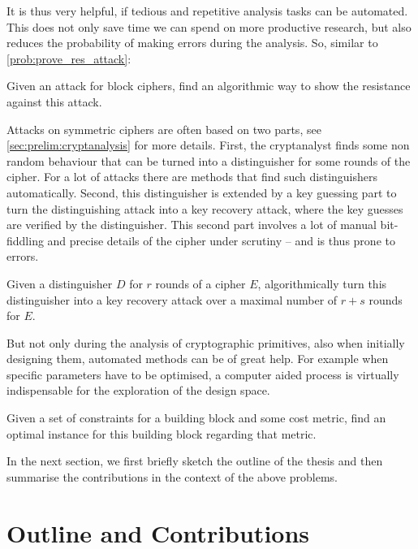 It is thus very helpful, if tedious and repetitive analysis tasks can be automated.
This does not only save time we can spend on more productive research, but also reduces the probability of making errors during the analysis.
So, similar to \cref{prob:prove_res_attack}:
\begin{problem}\label{prob:alg_res_attack}
    Given an attack for block ciphers, find an algorithmic way to show the resistance against this attack.
\end{problem}

Attacks on symmetric ciphers are often based on two parts, see \cref{sec:prelim:cryptanalysis} for more details.
First, the cryptanalyst finds some non random behaviour that can be turned into a distinguisher for some rounds of the cipher.
For a lot of attacks there are methods that find such distinguishers automatically.
Second, this distinguisher is extended by a key guessing part to turn the distinguishing attack into a key recovery attack, where the key guesses are verified by the distinguisher.
This second part involves a lot of manual bit-fiddling and precise details of the cipher under scrutiny -- and is thus prone to errors.
\begin{problem}\label{prob:key_rec}
    Given a distinguisher $D$ for $r$ rounds of a cipher $E$, algorithmically turn this distinguisher into a key recovery attack over a maximal number of $r+s$ rounds for $E$.
\end{problem}

But not only during the analysis of cryptographic primitives, also when initially designing them, automated methods can be of great help.
For example when specific parameters have to be optimised, a computer aided process is virtually indispensable for the exploration of the design space.
\begin{problem}\label{prob:optimise_bb}
    Given a set of constraints for a building block and some cost metric, find an optimal instance for this building block regarding that metric.
\end{problem}

In the next section, we first briefly sketch the outline of the thesis and then summarise the contributions in the context of the above problems.

\section{Outline and Contributions}

